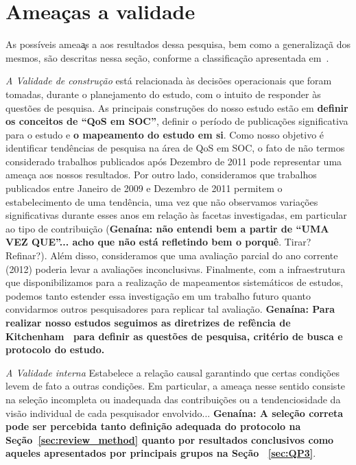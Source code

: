 \section{Amea\c cas a validade}

As poss\'{i}veis amea\c as a aos 
resultados dessa pesquisa, bem como a generaliza\c c\~{a} dos mesmos, 
s\~{a}o descritas nessa se\c c\~{a}o, conforme a 
classifica\c c\~{a}o apresentada em~\cite{leedy1980practical}. 

\noindent
\emph{A Validade de constru\c c\~{a}o} est\'{a} relacionada
\`{a}s decis\~{o}es operacionais que foram tomadas, durante o
planejamento do estudo, com o intuito de responder \`{a}s quest\~{o}es de
pesquisa. As principais constru\c{c}\~{o}es do nosso estudo est\~{a}o em \textbf{definir os conceitos de ``QoS em SOC''}, definir o per\'{i}odo de publica\c{c}\~{o}es significativa para o estudo e \textbf{o mapeamento do estudo em si}. Como nosso objetivo \'{e} identificar tend\^{e}ncias de pesquisa na \'{a}rea de QoS em SOC, o fato de n\~{a}o termos considerado trabalhos publicados ap\'{o}s Dezembro de 2011 pode representar uma amea\c ca aos nossos resultados. Por outro lado, consideramos que trabalhos publicados entre Janeiro de 2009 e Dezembro de 2011 permitem o estabelecimento de uma tend\^{e}ncia, uma vez que n\~{a}o observamos varia\c c\~{o}es significativas durante esses anos em rela\c c\~{a}o \`{a}s facetas investigadas, em particular ao tipo de
contribui\c c\~{a}o (\textbf{Genaína: não entendi bem a partir de ``UMA VEZ QUE''... acho que não está refletindo bem o porquê}. Tirar? Refinar?). Al\'{e}m disso, consideramos que uma avalia\c c\~{a}o parcial do ano corrente (2012) poderia levar a avalia\c{c}\~{o}es
inconclusivas. Finalmente, com a infraestrutura que disponibilizamos para a realiza\c
c\~{a}o de mapeamentos sistem\'{a}ticos de estudos, podemos tanto estender 
essa investiga\c c\~{a}o em um trabalho futuro quanto convidarmos outros 
pesquisadores para replicar tal avalia\c c\~{a}o. \textbf{Gena\'{i}na: Para realizar nosso estudos seguimos as diretrizes de ref\^{e}ncia de Kitchenham~\cite{kitchenham:techReport2007} para definir as quest\~{o}es de pesquisa, crit\'{e}rio de busca e protocolo do estudo.}

\noindent
\emph{A Validade interna}
Estabelece a rela\c{c}\~{a}o causal garantindo que certas condi\c{c}\~{o}es levem de fato a outras condi\c{c}\~{o}es. Em particular, a ameaça nesse sentido consiste na seleção incompleta ou inadequada das contribuições ou a tendenciosidade da visão individual de cada pesquisador envolvido... \textbf{Genaína: A seleção correta pode ser percebida tanto definição adequada do protocolo na Seção~\ref{sec:review_method} quanto por resultados conclusivos como aqueles apresentados por principais grupos na Se\c{c}\~{a}o ~\ref{sec:QP3}}.

